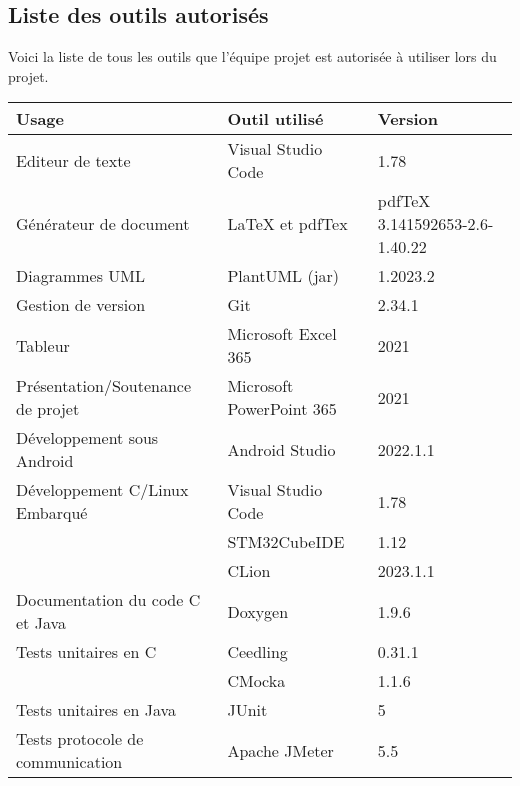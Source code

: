 \documentclass[a4paper,11pt,titlepage]{article}
\begin{document}
\subsection{Liste des outils autorisés}
Voici la liste de tous les outils que l'équipe projet
est autorisée à utiliser lors du projet.\\

\begin{table}[H]
    \begin{tabular}{|l|l|l|}
        \hline
        \rowcolor[HTML]{CCCCCC}
        \textbf{Usage}                    & \textbf{Outil utilisé}   & \textbf{Version}                 \\ \hline
        Editeur de texte                  & Visual Studio Code       & 1.78                             \\ \hline
        Générateur de document            & LaTeX et pdfTex          & pdfTeX 3.141592653-2.6-1.40.22   \\ \hline
        Diagrammes UML                    & PlantUML (jar)           & 1.2023.2                         \\ \hline
        Gestion de version                & Git                      & 2.34.1                           \\ \hline
        Tableur                           & Microsoft Excel 365      & 2021                             \\ \hline
        Présentation/Soutenance de projet & Microsoft PowerPoint 365 & 2021                             \\ \hline
        Développement sous Android        & Android Studio           & 2022.1.1                         \\ \hline
        Développement C/Linux Embarqué    & Visual Studio Code       & 1.78                             \\
                                          & STM32CubeIDE             & 1.12                             \\ \hline
                                          & CLion                    & 2023.1.1                         \\ \hline
        Documentation du code C et Java   & Doxygen                  & 1.9.6                            \\ \hline
        Tests unitaires en C              & Ceedling                 & 0.31.1                           \\
                                          & CMocka                   & 1.1.6                            \\ \hline
        Tests unitaires en Java           & JUnit                    & 5                                \\ \hline
        Tests protocole de communication  & Apache JMeter            & 5.5                              \\ \hline
    \end{tabular}
\end{table}
\end{document}

